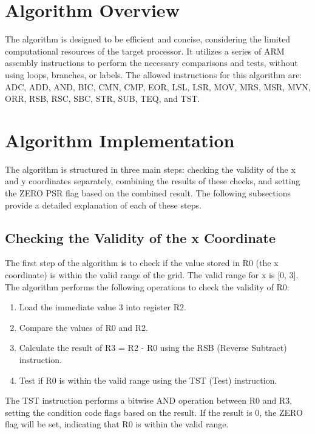 \section{Algorithm Overview}

The algorithm is designed to be efficient and concise, considering the limited computational resources of the target processor. It utilizes a series of ARM assembly instructions to perform the necessary comparisons and tests, without using loops, branches, or labels. The allowed instructions for this algorithm are: ADC, ADD, AND, BIC, CMN, CMP, EOR, LSL, LSR, MOV, MRS, MSR, MVN, ORR, RSB, RSC, SBC, STR, SUB, TEQ, and TST.

\section{Algorithm Implementation}

The algorithm is structured in three main steps: checking the validity of the x and y coordinates separately, combining the results of these checks, and setting the ZERO PSR flag based on the combined result. The following subsections provide a detailed explanation of each of these steps.

\subsection{Checking the Validity of the x Coordinate}

The first step of the algorithm is to check if the value stored in R0 (the x coordinate) is within the valid range of the grid. The valid range for x is [0, 3]. The algorithm performs the following operations to check the validity of R0:

\begin{enumerate}
    \item Load the immediate value 3 into register R2.
    \item Compare the values of R0 and R2.
    \item Calculate the result of R3 = R2 - R0 using the RSB (Reverse Subtract) instruction.
    \item Test if R0 is within the valid range using the TST (Test) instruction.
\end{enumerate}

The TST instruction performs a bitwise AND operation between R0 and R3, setting the condition code flags based on the result. If the result is 0, the ZERO flag will be set, indicating that R0 is within the valid range.

